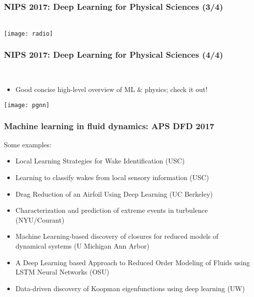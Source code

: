 \begin{frame}
    \frametitle{NIPS 2017: Deep Learning for Physical Sciences (3/4)}
     \citep{WellingNIPS17} \\[1ex]

    \centering
    \texttt{[image: radio]}
\end{frame}

\begin{frame}
    \frametitle{NIPS 2017: Deep Learning for Physical Sciences (4/4)}
     \citep{KarpatneNIPS17} \\[1ex]
    \begin{itemize}
        \item Good concise high-level overview of ML \& physics; check it out!
    \end{itemize}

    \centering
    \texttt{[image: pgnn]}
\end{frame}

\begin{frame}
    \frametitle{Machine learning in fluid dynamics: APS DFD 2017}
    Some examples:
    \begin{itemize}
        \item Local Learning Strategies for Wake Identification (USC)
        \item Learning to classify wakes from local sensory information (USC)
        \item Drag Reduction of an Airfoil Using Deep Learning (UC Berkeley)
        \item Characterization and prediction of extreme events in turbulence (NYU/Courant)
        \item Machine Learning-based discovery of closures for reduced models of dynamical systems (U Michigan Ann Arbor)
        \item A Deep Learning based Approach to Reduced Order Modeling of Fluids using LSTM Neural Networks (OSU)
        \item Data-driven discovery of Koopman eigenfunctions using deep learning (UW)
    \end{itemize}
\end{frame}

